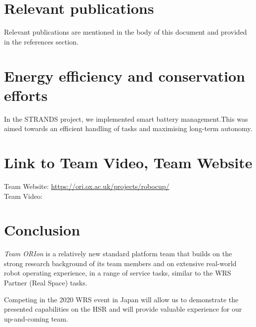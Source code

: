 \documentclass[runningheads,a4paper]{llncs}
\newcommand{\teamori}{Team ORIon}
\begin{document}
\section{Relevant publications }
Relevant publications are mentioned in the body of this document and provided in the references section.

\section{Energy efficiency and conservation efforts}
In the STRANDS project, we implemented smart battery management.This was aimed towards an efficient handling of tasks and maximising long-term autonomy.

\section{Link to Team Video, Team Website}
Team Website: \url{https://ori.ox.ac.uk/projects/robocup/} \\
Team Video: \url{} 


\section{Conclusion}
\textit{\teamori{}} is a relatively new standard platform team that builds on the strong research 
background of its team members and on extensive real-world robot operating
experience, in a range of service tasks, similar to the WRS Partner (Real Space) tasks. 

Competing in the 2020 WRS event in Japan will allow us to demonstrate 
the presented capabilities on the HSR and will provide valuable experience
for our up-and-coming team.



\end{document}
